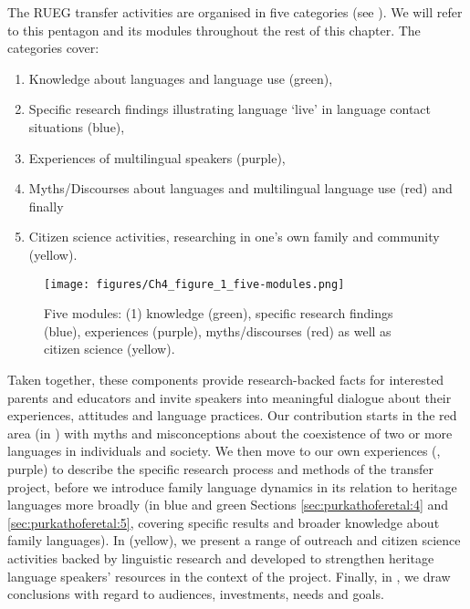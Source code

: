 \documentclass[output=paper,colorlinks,citecolor=brown]{langscibook}
\begin{document}
The RUEG transfer activities are organised in five categories (see ). We will refer to this pentagon and its modules throughout the rest of this chapter. The categories cover:

\begin{enumerate}
\item Knowledge about languages and language use (green),
\item Specific research findings illustrating language ‘live’ in language contact situations (blue),
\item Experiences of multilingual speakers (purple),
\item Myths/Discourses about languages and multilingual language use (red) and finally
\item Citizen science activities, researching in one's own family and community (yellow).
\end{enumerate}


\begin{figure}
     \texttt{[image: figures/Ch4\_figure\_1\_five-modules.png]}
     \caption{Five modules: (1) knowledge (green), specific research findings (blue), experiences (purple), myths/discourses (red) as well as citizen science (yellow).}
     \label{fig:purkarthoferetal:five-modules}
\end{figure}
 

Taken together, these components provide research-backed facts for interested parents and educators and invite speakers into meaningful dialogue about their experiences, attitudes and language practices. Our contribution starts in the red area (in ) with myths and misconceptions about the coexistence of two or more languages in individuals and society. We then move to our own experiences (, purple) to describe the specific research process and methods of the transfer project, before we introduce family language dynamics in its relation to heritage languages more broadly (in blue and green Sections \ref{sec:purkathoferetal:4} and \ref{sec:purkathoferetal:5}, covering specific results and broader knowledge about family languages). In  (yellow), we present a range of outreach and citizen science activities backed by linguistic research and developed to strengthen heritage language speakers’ resources in the context of the project. Finally, in , we draw conclusions with regard to audiences, investments, needs and goals.
\end{document}

